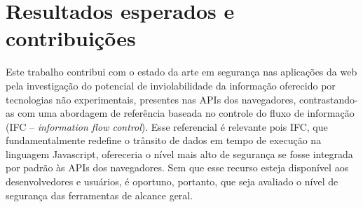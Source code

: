 \section{Resultados esperados e contribuições}


Este trabalho contribui com o estado da arte em segurança nas aplicações da web pela investigação do potencial de inviolabilidade da informação oferecido por tecnologias não experimentais, presentes nas APIs dos navegadores, contrastando-as com uma abordagem de referência baseada no controle do fluxo de informação (IFC -- \textit{information flow control}). Esse referencial é relevante pois IFC, que fundamentalmente redefine o trânsito de dados em tempo de execução na linguagem Javascript, ofereceria o nível mais alto de segurança se fosse integrada por padrão às APIs dos navegadores. Sem que esse recurso esteja disponível aos desenvolvedores e usuários, é oportuno, portanto, que seja avaliado o nível de segurança das ferramentas de alcance geral.

